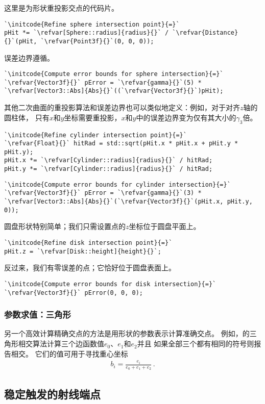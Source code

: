 这里是为形状重投影交点的代码片。
\begin{lstlisting}
`\initcode{Refine sphere intersection point}{=}`
pHit *= `\refvar[Sphere::radius]{radius}{}` / `\refvar{Distance}{}`(pHit, `\refvar{Point3f}{}`(0, 0, 0));
\end{lstlisting}

误差边界遵循。
\begin{lstlisting}
`\initcode{Compute error bounds for sphere intersection}{=}`
`\refvar{Vector3f}{}` pError = `\refvar{gamma}{}`(5) * `\refvar[Vector3::Abs]{Abs}{}`((`\refvar{Vector3f}{}`)pHit);
\end{lstlisting}

其他二次曲面的重投影算法和误差边界也可以类似地定义：例如，对于对齐$z$轴的圆柱体，
只有$x$和$y$坐标需要重投影，$x$和$y$中的误差边界变为仅有其大小的$\gamma_3$倍。
\begin{lstlisting}
`\initcode{Refine cylinder intersection point}{=}`
`\refvar{Float}{}` hitRad = std::sqrt(pHit.x * pHit.x + pHit.y * pHit.y);
pHit.x *= `\refvar[Cylinder::radius]{radius}{}` / hitRad;
pHit.y *= `\refvar[Cylinder::radius]{radius}{}` / hitRad;
\end{lstlisting}
\begin{lstlisting}
`\initcode{Compute error bounds for cylinder intersection}{=}`
`\refvar{Vector3f}{}` pError = `\refvar{gamma}{}`(3) * `\refvar[Vector3::Abs]{Abs}{}`(`\refvar{Vector3f}{}`(pHit.x, pHit.y, 0));
\end{lstlisting}

圆盘形状特别简单；我们只需设置点的$z$坐标位于圆盘平面上。
\begin{lstlisting}
`\initcode{Refine disk intersection point}{=}`
pHit.z = `\refvar[Disk::height]{height}{}`;
\end{lstlisting}

反过来，我们有零误差的点；它恰好位于圆盘表面上。
\begin{lstlisting}
`\initcode{Compute error bounds for disk intersection}{=}`
`\refvar{Vector3f}{}` pError(0, 0, 0);
\end{lstlisting}

\subsubsection*{参数求值：三角形}
另一个高效计算精确交点的方法是用形状的参数表示计算准确交点。
例如，的三角形相交算法计算三个边函数值$e_0$、$e_1$和$e_2$并且
如果全部三个都有相同的符号则报告相交。
它们的值可用于寻找重心坐标
\begin{align}
    b_i=\frac{e_i}{e_0+e_1+e_2}\, .
\end{align}


\subsection{稳定触发的射线端点}\label{sub:稳定触发的射线端点}